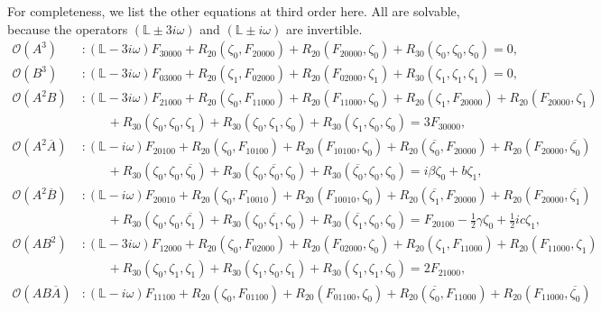 \documentclass[11pt]{article}
\numberwithin{equation}{section}
\begin{document}
For completeness, we list the other equations at third order here. 
All are solvable, because the operators 
$(\mathbb{L}\pm 3i\omega)$ and
$(\mathbb{L}\pm i\omega)$ are invertible.
\begin{equation}
\begin{split}
\mathcal{O}(A^3) &: (\mathbb{L} - 3i \omega) F_{30000} + R_{20}(\zeta_0,F_{20000}) + R_{20}(F_{20000},\zeta_0) + R_{30}(\zeta_0,\zeta_0,\zeta_0) = 0, \\
\mathcal{O}(B^3) &: (\mathbb{L} - 3i \omega) F_{03000} + R_{20}(\zeta_1,F_{02000}) + R_{20}(F_{02000},\zeta_1) + R_{30}(\zeta_1,\zeta_1,\zeta_1) = 0, \\
\mathcal{O}(A^2B) &: (\mathbb{L} - 3i \omega) F_{21000} 
+ R_{20}(\zeta_0,F_{11000}) + R_{20}(F_{11000},\zeta_0) 
+ R_{20}(\zeta_1,F_{20000}) + R_{20}(F_{20000},\zeta_1) \\
&{\qquad  } + R_{30}(\zeta_0,\zeta_0,\zeta_1)
+ R_{30}(\zeta_0,\zeta_1,\zeta_0)
+ R_{30}(\zeta_1,\zeta_0,\zeta_0)
= 3 F_{30000}, \\
\mathcal{O}(A^2\overline{A}) &: (\mathbb{L} - i \omega) F_{20100} 
+ R_{20}(\zeta_0,F_{10100}) + R_{20}(F_{10100},\zeta_0) 
+ R_{20}(\overline{\zeta_0},F_{20000}) + R_{20}(F_{20000},\overline{\zeta_0}) \\
&{\qquad} + R_{30}(\zeta_0,\zeta_0,\overline{\zeta_0})
+ R_{30}(\zeta_0,\overline{\zeta_0},\zeta_0)
+ R_{30}(\overline{\zeta_0},\zeta_0,\zeta_0)
= i \beta \zeta_0 + b \zeta_1, \\
\mathcal{O}(A^2\overline{B}) &: (\mathbb{L} - i \omega) F_{20010} 
+ R_{20}(\zeta_0,F_{10010}) + R_{20}(F_{10010},\zeta_0) 
+ R_{20}(\overline{\zeta_1},F_{20000}) + R_{20}(F_{20000},\overline{\zeta_1})  \\
&{\qquad} + R_{30}(\zeta_0,\zeta_0,\overline{\zeta_1})
+ R_{30}(\zeta_0,\overline{\zeta_1},\zeta_0)
+ R_{30}(\overline{\zeta_1},\zeta_0,\zeta_0)
= F_{20100} - \frac{1}{2}\gamma \zeta_0 + \frac{1}{2} i c \zeta_1, \\
\mathcal{O}(AB^2) &: (\mathbb{L} - 3i \omega) F_{12000} 
+ R_{20}(\zeta_0,F_{02000}) + R_{20}(F_{02000},\zeta_0) 
+ R_{20}(\zeta_1,F_{11000}) + R_{20}(F_{11000},\zeta_1) \\
&{\qquad  } + R_{30}(\zeta_0,\zeta_1,\zeta_1)
+ R_{30}(\zeta_1,\zeta_0,\zeta_1)
+ R_{30}(\zeta_1,\zeta_1,\zeta_0)
= 2 F_{21000}, \\
\mathcal{O}(AB\overline{A}) &: (\mathbb{L} - i \omega) F_{11100} 
+ R_{20}(\zeta_0,F_{01100}) + R_{20}(F_{01100},\zeta_0) 
+ R_{20}(\overline{\zeta_0},F_{11000}) + R_{20}(F_{11000},\overline{\zeta_0}) \\

\end{split}
\end{equation}
\end{document}
